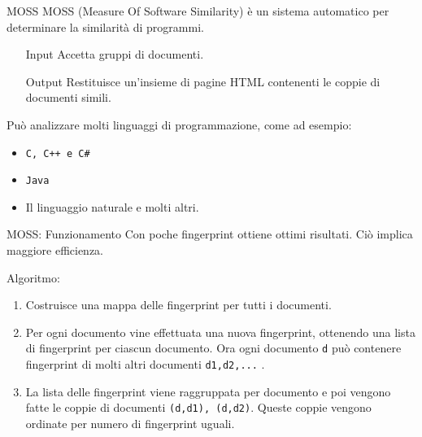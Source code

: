 \documentclass{beamer}
\begin{document}
	\begin{frame}{MOSS}
		MOSS (Measure Of Software Similarity) è un sistema automatico per determinare la similarità di programmi.
		
		\begin{itemize}
			\item[Input] Accetta gruppi di documenti.
			\item[Output] Restituisce un'insieme di pagine HTML contenenti le coppie di documenti simili.
		\end{itemize}
		
		\pause
		Può analizzare molti linguaggi di programmazione, come ad esempio:
		\begin{itemize}
			\item \texttt{C, C++ e C\#}
			\item \texttt{Java}
			\item Il linguaggio naturale e molti altri.
		\end{itemize}
	\end{frame}

	\begin{frame}{MOSS: Funzionamento}
		Con poche fingerprint ottiene ottimi risultati. Ciò implica maggiore efficienza.
		
		Algoritmo:
		\begin{enumerate}[<+->]
			\item Costruisce una mappa delle fingerprint per tutti i documenti.
			\item Per ogni documento vine effettuata una nuova fingerprint, ottenendo una lista di fingerprint per ciascun documento. Ora ogni documento \texttt{d} può contenere fingerprint di molti altri documenti \texttt{d1,d2,...} .
			\item La lista delle fingerprint viene raggruppata per documento e poi vengono fatte le coppie di documenti \texttt{(d,d1), (d,d2)}.
			Queste coppie vengono ordinate per numero di fingerprint uguali.
			
		\end{enumerate}
	\end{frame}
	
\end{document}
